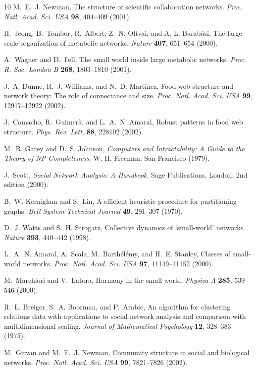 \documentclass[twocolumn,pre,superscriptaddress]{revtex4}
\begin{document}
\begin{thebibliography}{10}
M.~E.~J. Newman, The structure of scientific collaboration networks.
  \textit{Proc. Natl. Acad. Sci. USA} \textbf{98}, 404--409 (2001).

H.~Jeong, B.~Tombor, R.~Albert, Z.~N. Oltvai, and A.-L. Barab\'asi, The
  large-scale organization of metabolic networks. \textit{Nature} \textbf{407},
  651--654 (2000).

A.~Wagner and D.~Fell, The small world inside large metabolic networks.
  \textit{Proc. R. Soc. London B} \textbf{268}, 1803--1810 (2001).

J.~A. Dunne, R.~J. Williams, and N.~D. Martinez, Food-web structure and network
  theory: The role of connectance and size. \textit{Proc. Natl. Acad. Sci. USA}
  \textbf{99}, 12917--12922 (2002).

J.~Camacho, R.~Guimer\`a, and L.~A.~N. Amaral, Robust patterns in food web
  structure. \textit{Phys. Rev. Lett.} \textbf{88}, 228102 (2002).

M.~R. Garey and D.~S. Johnson, \textit{Computers and Intractability: A Guide to
  the Theory of NP-Completeness}. W. H. Freeman, San Francisco (1979).

J.~Scott, \textit{Social Network Analysis: A Handbook}. Sage Publications,
  London, 2nd edition (2000).

B.~W. Kernighan and S.~Lin, A efficient heuristic procedure for partitioning
  graphs. \textit{Bell System Technical Journal} \textbf{49}, 291--307 (1970).

D.~J. Watts and S.~H. Strogatz, Collective dynamics of `small-world' networks.
  \textit{Nature} \textbf{393}, 440--442 (1998).

L.~A.~N. Amaral, A.~Scala, M.~Barth\'el\'emy, and H.~E. Stanley, Classes of
  small-world networks. \textit{Proc. Natl. Acad. Sci. USA} \textbf{97},
  11149--11152 (2000).

M.~Marchiori and V.~Latora, Harmony in the small-world. \textit{Physica A}
  \textbf{285}, 539--546 (2000).

R.~L. Breiger, S.~A. Boorman, and P.~Arabie, An algorithm for clustering
  relations data with applications to social network analysis and comparison
  with multidimensional scaling. \textit{Journal of Mathematical Psychology}
  \textbf{12}, 328--383 (1975).

M.~Girvan and M.~E.~J. Newman, Community structure in social and biological
  networks. \textit{Proc. Natl. Acad. Sci. USA} \textbf{99}, 7821--7826 (2002).


\end{thebibliography}
\end{document}
